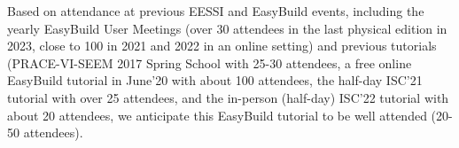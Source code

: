 
Based on attendance at previous EESSI and EasyBuild events, including the yearly EasyBuild User Meetings (over 30 attendees in the last physical edition in 2023, close to 100 in 2021 and 2022 in an online setting) and previous tutorials (PRACE-VI-SEEM 2017 Spring School with 25-30 attendees, a free online EasyBuild tutorial in June'20 with about 100 attendees, the half-day ISC'21 tutorial with over 25 attendees, and the in-person (half-day) ISC'22 tutorial with about 20 attendees, we anticipate this EasyBuild tutorial to be well attended (20-50 attendees).




